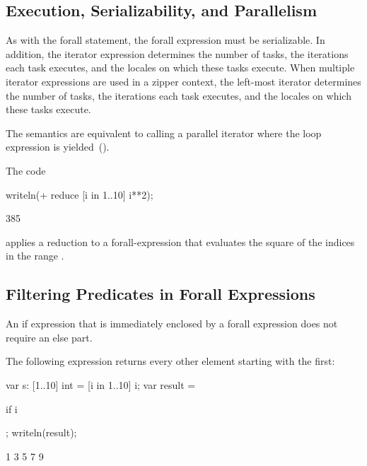\subsection{Execution, Serializability, and Parallelism}

As with the forall statement, the forall expression must be
serializable.  In addition, the iterator expression determines the
number of tasks, the iterations each task executes, and the locales on
which these tasks execute.  When multiple iterator expressions are
used in a zipper context, the left-most iterator determines the number
of tasks, the iterations each task executes, and the locales on which
these tasks execute.

The semantics are equivalent to calling a parallel iterator where the
loop expression is yielded~().

\begin{example}
The code
\begin{chapelpre}
\end{chapelpre}
\begin{chapel}
writeln(+ reduce [i in 1..10] i**2);
\end{chapel}
\begin{chapeloutput}
385
\end{chapeloutput}
applies a reduction to a forall-expression that evaluates the square
of the indices in the range .
\end{example}

\subsection{Filtering Predicates in Forall Expressions}
\label{Filtering_Predicates_Forall}

An if expression that is immediately enclosed by a forall expression
does not require an else part.
\begin{example}
The following expression returns every other element starting with the
first:
\begin{chapelpre}
var s: [1..10] int = [i in 1..10] i;
var result =
\end{chapelpre}
\begin{chapel}
[i in 1..s.numElements] if i %
\end{chapel}
\begin{chapelpost}
;
writeln(result);
\end{chapelpost}
\begin{chapeloutput}
1 3 5 7 9
\end{chapeloutput}
\end{example}

